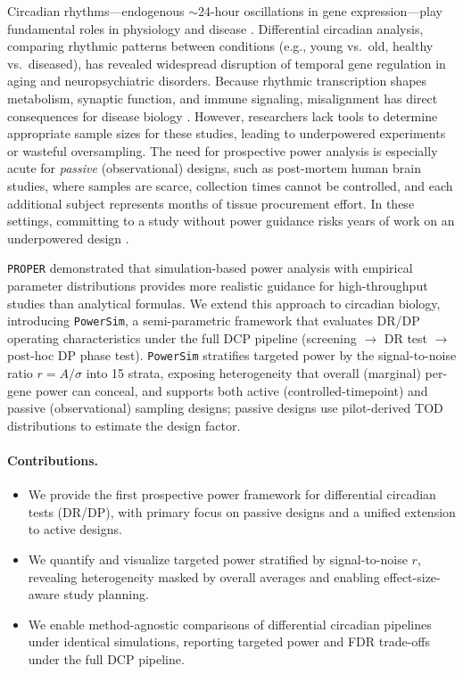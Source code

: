 \documentclass{article}
\newcommand{\software}[1]{\texttt{#1}}
\begin{document}
Circadian rhythms—endogenous $\sim$24-hour oscillations in gene expression—play fundamental roles in physiology and disease \cite{takahashi2017transcriptional}. Differential circadian analysis, comparing rhythmic patterns between conditions (e.g., young vs.\ old, healthy vs.\ diseased), has revealed widespread disruption of temporal gene regulation in aging \cite{chen2016aging} and neuropsychiatric disorders. Because rhythmic transcription shapes metabolism, synaptic function, and immune signaling, misalignment has direct consequences for disease biology \cite{takahashi2017transcriptional,mure2018diurnal,chen2016aging}. However, researchers lack tools to determine appropriate sample sizes for these studies, leading to underpowered experiments or wasteful oversampling. The need for prospective power analysis is especially acute for \emph{passive} (observational) designs, such as post-mortem human brain studies, where samples are scarce, collection times cannot be controlled, and each additional subject represents months of tissue procurement effort. In these settings, committing to a study without power guidance risks years of work on an underpowered design \cite{zong2023circapower}.


\software{PROPER} \cite{wu2015proper} demonstrated that simulation-based power analysis with empirical parameter distributions provides more realistic guidance for high-throughput studies than analytical formulas. We extend this approach to circadian biology, introducing \software{PowerSim}, a semi-parametric framework that evaluates DR/DP operating characteristics under the full DCP pipeline (screening $\rightarrow$ DR test $\rightarrow$ post-hoc DP phase test). \software{PowerSim} stratifies targeted power by the signal-to-noise ratio $r = A/\sigma$ into 15 strata, exposing heterogeneity that overall (marginal) per-gene power can conceal, and supports both active (controlled-timepoint) and passive (observational) sampling designs; passive designs use pilot-derived TOD distributions to estimate the design factor.

\paragraph{Contributions.}
\begin{itemize}
\item We provide the first prospective power framework for differential circadian tests (DR/DP), with primary focus on passive designs and a unified extension to active designs.
\item We quantify and visualize targeted power stratified by signal-to-noise $r$, revealing heterogeneity masked by overall averages and enabling effect-size-aware study planning.
\item We enable method-agnostic comparisons of differential circadian pipelines under identical simulations, reporting targeted power and FDR trade-offs under the full DCP pipeline.
\end{itemize}
\end{document}
